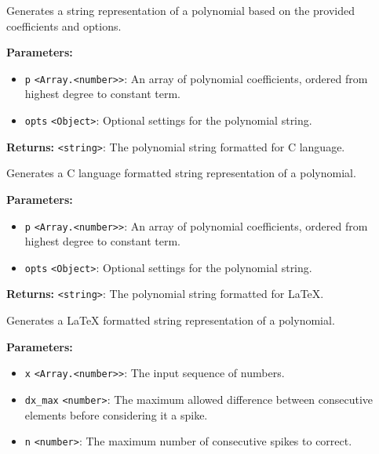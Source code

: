 \documentclass[12pt,a4paper]{article}
\begin{document}
\noindent Generates a string representation of a polynomial based on the provided coefficients and options.

\vspace{5mm}
\noindent {}


\noindent \textbf{Parameters:}
\begin{itemize}
  \item \texttt{p} \texttt{<Array.<number>>}: An array of polynomial coefficients, ordered from highest degree to constant term.
  \item \texttt{opts} \texttt{<Object>}: Optional settings for the polynomial string.
\end{itemize}

\noindent \textbf{Returns:} \texttt{<string>}: The polynomial string formatted for C language.

\noindent Generates a C language formatted string representation of a polynomial.

\vspace{5mm}
\noindent {}


\noindent \textbf{Parameters:}
\begin{itemize}
  \item \texttt{p} \texttt{<Array.<number>>}: An array of polynomial coefficients, ordered from highest degree to constant term.
  \item \texttt{opts} \texttt{<Object>}: Optional settings for the polynomial string.
\end{itemize}

\noindent \textbf{Returns:} \texttt{<string>}: The polynomial string formatted for LaTeX.

\noindent Generates a LaTeX formatted string representation of a polynomial.

\vspace{5mm}
\noindent {}


\noindent \textbf{Parameters:}
\begin{itemize}
  \item \texttt{x} \texttt{<Array.<number>>}: The input sequence of numbers.
  \item \texttt{dx\_max} \texttt{<number>}: The maximum allowed difference between consecutive elements before considering it a spike.
  \item \texttt{n} \texttt{<number>}: The maximum number of consecutive spikes to correct.
\end{itemize}
\end{document}
